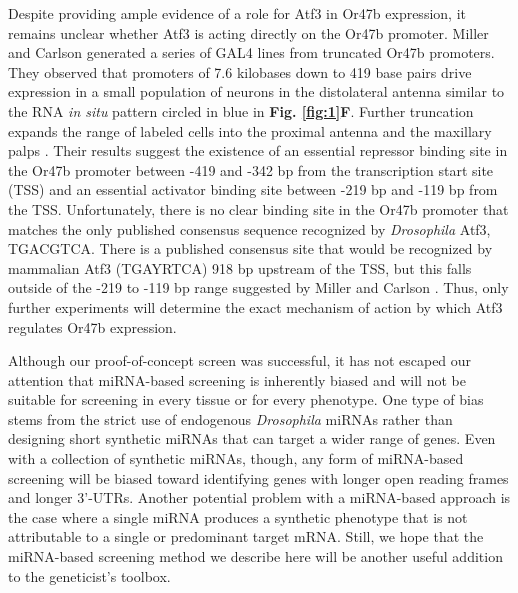 Despite providing ample evidence of a role for Atf3 in Or47b expression, it remains unclear whether Atf3 is acting directly on the Or47b promoter.
Miller and Carlson generated a series of GAL4 lines from truncated Or47b promoters.
They observed that promoters of 7.6 kilobases down to 419 base pairs drive expression in a small population of neurons in the distolateral antenna similar to the RNA \emph{in situ} pattern circled in blue in \textbf{Fig. \ref{fig:1}F}.
Further truncation expands the range of labeled cells into the proximal antenna and the maxillary palps \cite{Miller_Carlson_2010}.
Their results suggest the existence of an essential repressor binding site in the Or47b promoter between -419 and -342 bp from the transcription start site (TSS) and an essential activator binding site between -219 bp and -119 bp from the TSS.
Unfortunately, there is no clear binding site in the Or47b promoter that matches the only published \cite{a_Bohmann_Jindra_Uhlirova_2009} consensus sequence recognized by \emph{Drosophila} Atf3, TGACGTCA.
There is a published \cite{Brodesser_Jindra_Uhlirova_2012} consensus site that would be recognized by mammalian Atf3 (TGAYRTCA) 918 bp upstream of the TSS, but this falls outside of the -219 to -119 bp range suggested by Miller and Carlson \cite{Miller_Carlson_2010}.
Thus, only further experiments will determine the exact mechanism of action by which Atf3 regulates Or47b expression.

Although our proof-of-concept screen was successful, it has not escaped our attention that miRNA-based screening is inherently biased and will not be suitable for screening in every tissue or for every phenotype.
One type of bias stems from the strict use of endogenous \emph{Drosophila} miRNAs rather than designing short synthetic miRNAs that can target a wider range of genes.
Even with a collection of synthetic miRNAs, though, any form of miRNA-based screening will be biased toward identifying genes with longer open reading frames and longer 3'-UTRs.
Another potential problem with a miRNA-based approach is the case where a single miRNA produces a synthetic phenotype that is not attributable to a single or predominant target mRNA.
Still, we hope that the miRNA-based screening method we describe here will be another useful addition to the geneticist's toolbox.
